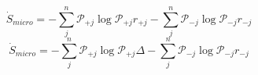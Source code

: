 \begin{equation}
\dot S_{micro} = -\sum_j^n\mathcal P_{+j}\log\mathcal P_{+j}r_{+j} -\sum_j^n\mathcal P_{-j}\log\mathcal P_{-j} r_{-j}
\end{equation}
\begin{equation}
\dot S_{micro} = -\sum_j^n\mathcal P_{+j}\log\mathcal P_{+j}\Delta -\sum_j^n\mathcal P_{-j}\log\mathcal P_{-j} r_{-j}
\end{equation}